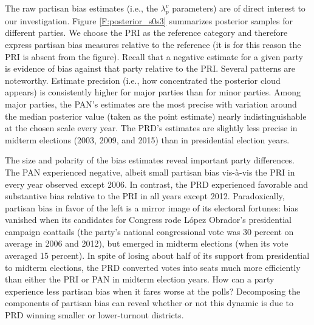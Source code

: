 \documentclass[letter,12pt]{article}
\begin{document}
{%

The raw partisan bias estimates (i.e., the $\lambda_p^v$ parameters) are of direct interest to our investigation. Figure \ref{F:posterior_s0s3} summarizes posterior samples for different parties. We choose the PRI as the reference category and therefore express partisan bias measures relative to the reference (it is for this reason the PRI is absent from the figure). Recall that a negative estimate for a given party is evidence of bias against that party relative to the PRI. Several patterns are noteworthy. Estimate precision (i.e., how concentrated the posterior cloud appears) is consistently higher for major parties than for minor parties. Among major parties, the PAN's estimates are the most precise with variation around the median posterior value (taken as the point estimate) nearly indistinguishable at the chosen scale every year. The PRD's estimates are slightly less precise in midterm elections (2003, 2009, and 2015) than in presidential election years.  

The size and polarity of the bias estimates reveal important party differences. The PAN experienced negative, albeit small partisan bias vis-\`a-vis the PRI in every year observed except 2006. In contrast, the PRD experienced favorable and substantive bias relative to the PRI in all years except 2012. Paradoxically, partisan bias in favor of the left is a mirror image of its electoral fortunes: bias vanished when its candidates for Congress rode L\'opez Obrador's presidential campaign coattails (the party's national congressional vote was 30 percent on average in 2006 and 2012), but emerged in midterm elections (when its vote averaged 15 percent). In spite of losing about half of its support from presidential to midterm elections, the PRD converted votes into seats much more efficiently than either the PRI or PAN in midterm election years. How can a party experience less partisan bias when it fares worse at the polls? Decomposing the components of partisan bias can reveal whether or not this dynamic is due to PRD winning smaller or lower-turnout districts.


}
\end{document}
